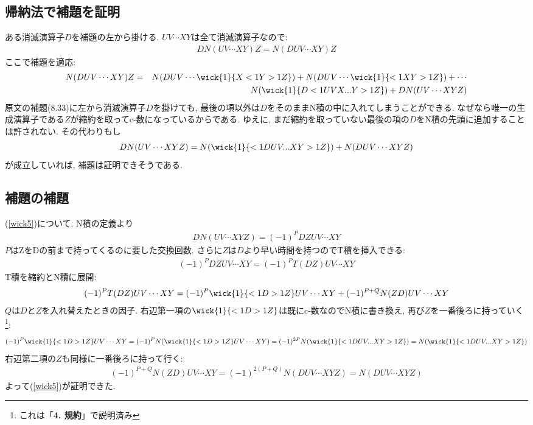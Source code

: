 \documentclass[10.5pt,a4paper]{jreport}
\begin{document}
\subsection{帰納法で補題を証明}
ある消滅演算子$D$を補題の左から掛ける. $UV\cdots XY$は全て消滅演算子なので:
\begin{eqnarray}
  DN(UV\cdots XY)Z = N(DUV\cdots XY)Z
\end{eqnarray}
ここで補題を適応:
\begin{eqnarray}
  \nonumber  N(DUV\cdots XY)Z &=& N(DUV\cdots \wick{1}{X <1Y >1Z}) + N(DUV\cdots \wick{1}{<1X Y >1Z}) + \cdots \\
  && N(\wick{1}{D<1UVX... Y >1Z}) + DN(UV\cdots XYZ)
\end{eqnarray}
原文の補題(8.33)に左から消滅演算子$D$を掛けても, 最後の項以外は$D$をそのままN積の中に入れてしまうことができる. なぜなら唯一の生成演算子である$Z$が縮約を取ってc-数になっているからである. ゆえに, まだ縮約を取っていない最後の項の$D$をN積の先頭に追加することは許されない. その代わりもし
\begin{eqnarray}
  DN(UV\cdots XYZ) = N(\wick{1}{<1DUV... XY>1Z}) + N(DUV\cdots XYZ)\label{wick5}
\end{eqnarray}
が成立していれば, 補題は証明できそうである. 

\subsection{補題の補題}
(\ref{wick5})について. N積の定義より
\begin{eqnarray}
  DN(UV\cdots XYZ) = (-1)^PDZUV\cdots XY
\end{eqnarray}
$P$はZをDの前まで持ってくるのに要した交換回数. さらに$Z$は$D$より早い時間を持つのでT積を挿入できる:
\begin{eqnarray}
  (-1)^PDZUV\cdots XY = (-1)^PT(DZ)UV\cdots XY  
\end{eqnarray}
T積を縮約とN積に展開:
\begin{eqnarray}
  (-1)^PT(DZ)UV\cdots XY = (-1)^P\wick{1}{<1D >1Z}UV\cdots XY + (-1)^{P+Q}N(ZD)UV\cdots XY
\end{eqnarray}
$Q$は$D$と$Z$を入れ替えたときの因子. 右辺第一項の$\wick{1}{<1D >1Z}$は既にc-数なのでN積に書き換え, 再び$Z$を一番後ろに持っていく\footnote{これは「\textbf{4. 規約}」で説明済み}:
\begin{eqnarray}
  (-1)^P\wick{1}{<1D >1Z}UV\cdots XY = (-1)^PN(\wick{1}{<1D >1Z}UV\cdots XY) = (-1)^{2P}N(\wick{1}{<1D UV... XY >1Z}) = N(\wick{1}{<1D UV... XY >1Z})
\end{eqnarray}
右辺第二項の$Z$も同様に一番後ろに持って行く:
\begin{eqnarray}
  (-1)^{P+Q}N(ZD)UV\cdots XY = (-1)^{2(P+Q)}N(DUV\cdots XYZ)= N(DUV\cdots XYZ)
\end{eqnarray}
よって(\ref{wick5})が証明できた. 
\end{document}
